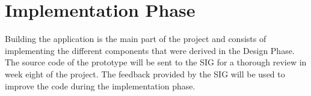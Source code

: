 \section{Implementation Phase}
Building the application is the main part of the project and consists of implementing the different components that were derived in the Design Phase. The source code of the prototype will be sent to the SIG for a thorough review in week eight of the project. The feedback provided by the SIG will be used to improve the code during the implementation phase.